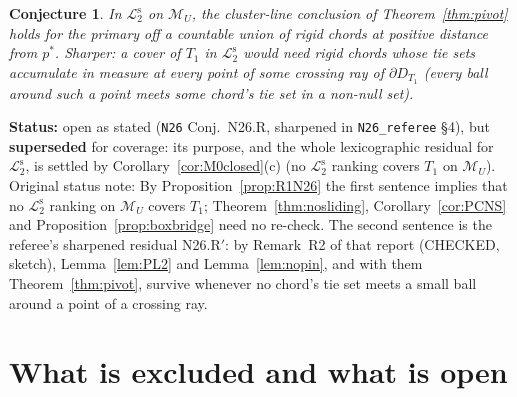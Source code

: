 \documentclass[11pt]{article}
\newtheorem{conjecture}[theorem]{Conjecture}
\theoremstyle{definition}
\theoremstyle{remark}
\newcommand{\M}{\mathcal M}
\newcommand{\src}[1]{\texttt{#1}}
\newcommand{\status}[1]{\par\smallskip\noindent\textbf{Status:} #1\par\smallskip}
\newcommand{\Ltwo}{\mathcal L_2^{\mathrm s}}
\begin{document}
\begin{conjecture}\label{conj:N26R}
In $\Ltwo$ on $\M_U$, the cluster-line conclusion of Theorem~\ref{thm:pivot} holds for the primary off a countable union of rigid chords at positive distance from $p^*$. Sharper: a cover of $T_1$ in $\Ltwo$ would need rigid chords whose tie sets accumulate in measure at every point of some crossing ray of $\partial D_{T_1}$ (every ball around such a point meets some chord's tie set in a non-null set).
\end{conjecture}
\status{open as stated (\src{N26} Conj.~N26.R, sharpened in \src{N26\_referee} \S4), but \textbf{superseded} for coverage: its purpose, and the whole lexicographic residual for $\Ltwo$, is settled by Corollary~\ref{cor:M0closed}(c) (no $\Ltwo$ ranking covers $T_1$ on $\M_U$). Original status note: By Proposition~\ref{prop:R1N26} the first sentence implies that no $\Ltwo$ ranking on $\M_U$ covers $T_1$; Theorem~\ref{thm:nosliding}, Corollary~\ref{cor:PCNS} and Proposition~\ref{prop:boxbridge} need no re-check. The second sentence is the referee's sharpened residual N26.R$'$: by Remark~R2 of that report (CHECKED, sketch), Lemma~\ref{lem:PL2} and Lemma~\ref{lem:nopin}, and with them Theorem~\ref{thm:pivot}, survive whenever no chord's tie set meets a small ball around a point of a crossing ray.}

\section{What is excluded and what is open}\label{sec:open}
\end{document}
